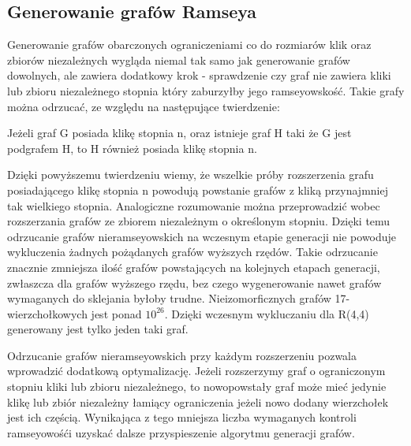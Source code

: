    \subsection{Generowanie grafów Ramseya}
   Generowanie grafów obarczonych ograniczeniami co do rozmiarów klik oraz zbiorów niezależnych wygląda niemal tak samo jak generowanie grafów dowolnych, 
   ale zawiera dodatkowy krok - sprawdzenie czy graf nie zawiera kliki lub zbioru niezależnego stopnia który zaburzyłby jego ramseyowskość. Takie grafy można odrzucać, ze względu na następujące twierdzenie:
     \begin{theorem}
      Jeżeli graf G posiada klikę stopnia n, oraz istnieje graf H taki że G jest podgrafem H, to H również posiada klikę stopnia n.
   \end{theorem}
  Dzięki powyższemu twierdzeniu wiemy, że wszelkie próby rozszerzenia grafu posiadającego klikę stopnia n powodują powstanie grafów z kliką przynajmniej tak wielkiego stopnia. Analogiczne rozumowanie można przeprowadzić wobec rozszerzania grafów ze zbiorem niezależnym o określonym stopniu. Dzięki temu odrzucanie grafów nieramseyowskich na wczesnym etapie generacji nie powoduje wykluczenia żadnych pożądanych grafów wyższych rzędów. Takie odrzucanie znacznie zmniejsza ilość grafów powstających na kolejnych etapach generacji, zwłaszcza dla grafów wyższego rzędu, bez czego wygenerowanie nawet grafów wymaganych do sklejania byłoby trudne. Nieizomorficznych grafów 17-wierzchołkowych jest ponad $10^{26}$\cite{OEIS}. Dzięki wczesnym wykluczaniu dla R(4,4) generowany jest tylko jeden taki graf. 
  
Odrzucanie grafów nieramseyowskich przy każdym rozszerzeniu pozwala wprowadzić dodatkową optymalizację. Jeżeli rozszerzymy graf o ograniczonym stopniu kliki lub zbioru niezależnego, to nowopowstały graf może mieć jedynie klikę lub zbiór niezależny łamiący ograniczenia jeżeli nowo dodany wierzchołek jest ich częścią. Wynikająca z tego mniejsza liczba wymaganych kontroli ramseyowośći uzyskać dalsze przyspieszenie algorytmu generacji grafów.
